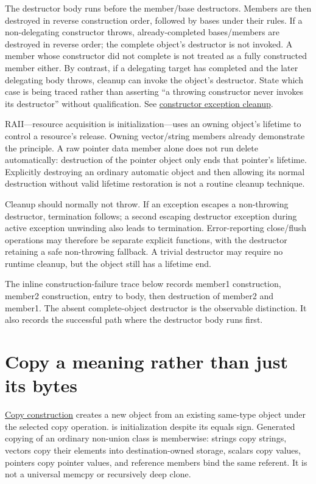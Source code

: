 The destructor body runs before the member/base destructors. Members are then destroyed in reverse construction order, followed by bases under their rules. If a non-delegating constructor throws, already-completed bases/members are destroyed in reverse order; the complete object's destructor is not invoked. A member whose constructor did not complete is not treated as a fully constructed member either. By contrast, if a delegating target has completed and the later delegating body throws, cleanup can invoke the object's destructor. State which case is being traced rather than asserting ``a throwing constructor never invokes its destructor'' without qualification. See \href{https://eel.is/c++draft/except.ctor}{constructor exception cleanup}.

RAII---resource acquisition is initialization---uses an owning object's lifetime to control a resource's release. Owning vector/string members already demonstrate the principle. A raw pointer data member alone does not run delete automatically: destruction of the pointer object only ends that pointer's lifetime. Explicitly destroying an ordinary automatic object and then allowing its normal destruction without valid lifetime restoration is not a routine cleanup technique.

Cleanup should normally not throw. If an exception escapes a non-throwing destructor, termination follows; a second escaping destructor exception during active exception unwinding also leads to termination. Error-reporting close/flush operations may therefore be separate explicit functions, with the destructor retaining a safe non-throwing fallback. A trivial destructor may require no runtime cleanup, but the object still has a lifetime end.

The inline construction-failure trace below records member1 construction, member2 construction, entry to body, then destruction of member2 and member1. The absent complete-object destructor is the observable distinction. It also records the successful path where the destructor body runs first.

\section{Copy a meaning rather than just its bytes}\label{01-foundations-i-ch003-copy-a-meaning-rather-than-just-its-bytes}

\hypertarget{01-foundations-i-ch003-copy-a-meaning-rather-than-just-its-bytes}{}

\hyperref[appendix-1340cd1ce582]{Copy construction} creates a new object from an existing same-type object under the selected copy operation.  is initialization despite its equals sign. Generated copying of an ordinary non-union class is memberwise: strings copy strings, vectors copy their elements into destination-owned storage, scalars copy values, pointers copy pointer values, and reference members bind the same referent. It is not a universal memcpy or recursively deep clone.

